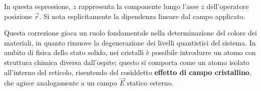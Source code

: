 In questa espressione, \(z\) rappresenta la componente lungo l'asse \(z\) dell'operatore posizione \(\vec{r}\). Si nota esplicitamente la dipendenza lineare dal campo applicato.

Questa correzione gioca un ruolo fondamentale nella determinazione del colore dei materiali, in quanto rimuove la degenerazione dei livelli quantistici del sistema. In ambito di fisica dello stato solido, nei cristalli è possibile introdurre un atomo con struttura chimica diversa dall'ospite; questo si comporta come un atomo isolato all'interno del reticolo, risentendo del cosiddetto \textbf{effetto di campo cristallino}, che agisce analogamente a un campo \(\vec{E}\) statico esterno.

